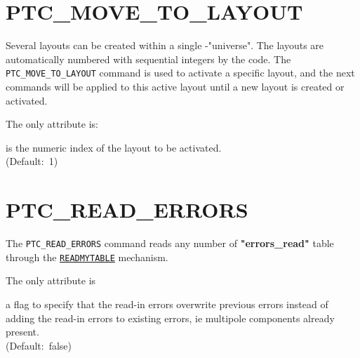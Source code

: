 
\section{PTC\_MOVE\_TO\_LAYOUT}
\label{sec:ptc-move-to-layout}

Several \ptc layouts can be created within a single \ptc-"universe". 
The layouts are automatically numbered with sequential integers by the 
\madx code. The \texttt{PTC\_MOVE\_TO\_LAYOUT} command is used to
activate a specific layout, and the next \ptc commands will be
applied to this active \ptc layout until a new \ptc layout is created
or activated. 


The only attribute is:
\begin{madlist}
	 is the numeric index of the \ptc layout to be
	activated.\\ (Default:~1)
\end{madlist}

\section{PTC\_READ\_ERRORS}
\label{sec:ptc-read-errors}

The \texttt{PTC\_READ\_ERRORS} command reads any number of
\textbf{"errors\_read"} table through the 
\hyperref[sec:readmytable]{\texttt{READMYTABLE}} mechanism.


The only attribute is 
\begin{madlist}
    a flag to specify that the read-in errors
   overwrite previous errors instead of adding the read-in errors to
   existing errors, ie multipole components already present.\\
   (Default:~false)  
\end{madlist}

